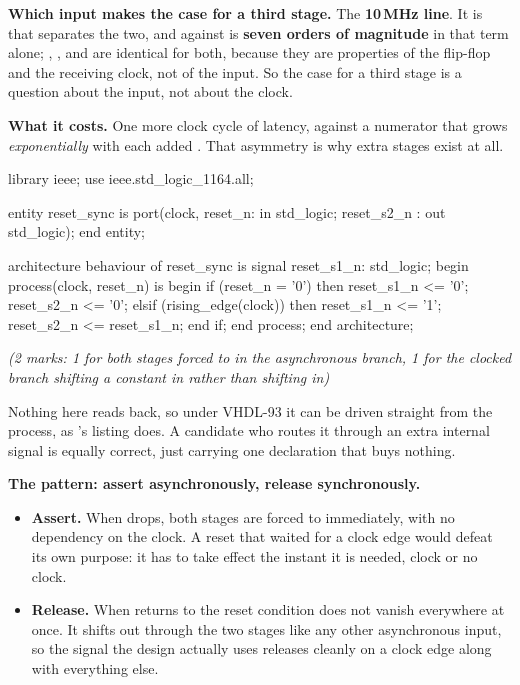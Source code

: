 \textbf{Which input makes the case for a third stage.} The \textbf{10\,MHz line}. It is
 that separates the two, and  against  is \textbf{seven orders
of magnitude} in that term alone; , ,  and  are
identical for both, because they are properties of the flip-flop and the receiving clock, not of the
input. So the case for a third stage is a question about the input, not about the clock.

\textbf{What it costs.} One more clock cycle of latency, against a numerator that grows
\emph{exponentially} with each added . That asymmetry is why extra stages exist at all.

\begin{vhdlcode}
library ieee;
use ieee.std_logic_1164.all;

entity reset_sync is
    port(clock, reset_n: in  std_logic;
         reset_s2_n    : out std_logic);
end entity;

architecture behaviour of reset_sync is
signal reset_s1_n: std_logic;
begin
    process(clock, reset_n) is
    begin
        if (reset_n = '0') then
            reset_s1_n <= '0';
            reset_s2_n <= '0';
        elsif (rising_edge(clock)) then
            reset_s1_n <= '1';
            reset_s2_n <= reset_s1_n;
        end if;
    end process;
end architecture;
\end{vhdlcode}

\noindent\textit{(2 marks: 1 for both stages forced to  in the asynchronous branch, 1 for
the clocked branch shifting a constant  in rather than shifting  in)}

Nothing here reads  back, so under VHDL-93 it can be driven straight from the
process, as 's listing does. A candidate who routes it through an extra internal
signal is equally correct, just carrying one declaration that buys nothing.

\textbf{The pattern: assert asynchronously, release synchronously.}
\begin{itemize}
  \item \textbf{Assert.} When  drops, both stages are forced to  immediately,
    with no dependency on the clock. A reset that waited for a clock edge would defeat its own
    purpose: it has to take effect the instant it is needed, clock or no clock.
  \item \textbf{Release.} When  returns to  the reset condition does not
    vanish everywhere at once. It shifts out through the two stages like any other asynchronous
    input, so the signal the design actually uses releases cleanly on a clock edge along with
    everything else.
\end{itemize}

